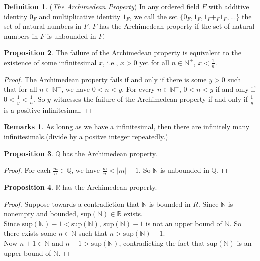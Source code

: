 \documentclass[14pt]{article}
\theoremstyle{definition}
\newtheorem*{remark}{Remarks}
\newtheorem{definition}{Definition}[subsection]
\newtheorem{proposition}[definition]{Proposition}
\newcommand{\bb}[1]{\mathbb{#1}}
\begin{document}
\begin{definition}
    (\textit{The Archimedean Property}) In any ordered field $F$ with additive identity $0_{F}$
    and multiplicative identity $1_{F}$, we call the set $\{0_{F}, 1_{F}, 1_{F}+_{F}1_{F},...\}$
    the set of natural numbers in $F$. $F$ has the Archimedean property if the set of natural 
    numbers in $F$ is unbounded in $F$.
\end{definition}

\vspace{2mm}

\begin{proposition}
    The failure of the Archimedean property is equivalent to the existence of some 
    infinitesimal $x$, i.e., $x>0$ yet for all $n\in \bb{N^+}$, $x<\frac{1}{n}$.
\end{proposition}

\begin{proof}
    The Archimedean property fails if and only if there is some $y>0$ 
    such that  for all $n\in\bb{N}^+$,  we have $0<n<y$. For every $n\in\bb{N}^+$,
    $0<n<y$ if and only if $0<\frac{1}{y}<\frac{1}{n}$. So $y$ witnesses the failure of 
    the Archimedean property if and only if $\frac{1}{y}$ is a positive infinitesimal.
\end{proof}
\begin{remark}
    As lonng as we have a infinitesimal, then there are infinitely many infinitesimals.(divide
    by a positve integer repeatedly.)
\end{remark}
\vspace{2mm}

\begin{proposition}
    $\bb{Q}$ has the Archimedean property.
\end{proposition}

\begin{proof}
    For each $\frac{m}{n}\in\bb{Q}$, we have $\frac{m}{n}<|m|+1$. So $\bb{N}$ is 
    unbounded in $\bb{Q}$.
\end{proof}
\vspace{2mm}

\begin{proposition}
    $\bb{R}$ has the Archimedean property.
\end{proposition}
\begin{proof}
    Suppose towards a contradiction that $\bb{N}$ is bounded in $R$. Since $\bb{N}$
    is nonempty and bounded, $\mathrm{sup}(\bb{N})\in\bb{R}$ exists.\\
    Since $\mathrm{sup}(\bb{N})-1<\mathrm{sup}(\bb{N})$, $\mathrm{sup}(\bb{N})-1$
    is not an upper bound of $\bb{N}$. So there exists some $n\in\bb{N}$ such 
    that $n>\mathrm{sup}(\bb{N})-1$.\\
    Now $n+1\in \bb{N}$ and $n+1>\mathrm{sup}(\bb{N})$, contradicting the fact that
    $\mathrm{sup}(\bb{N})$ is an upper bound of $\bb{N}$.

\end{proof}
\end{document}
